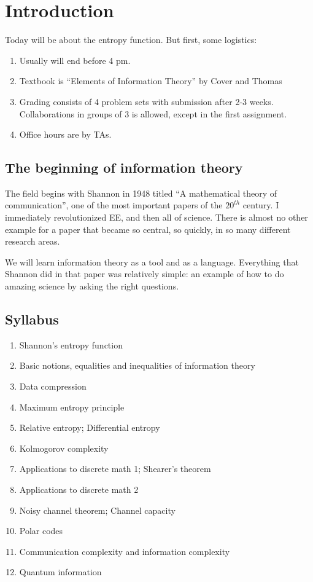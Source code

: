 \documentclass{article}
\begin{document}
\section{Introduction}

Today will be about the entropy function. But first, some logistics:
\begin{enumerate}
    \item Usually will end before 4 pm.
    \item Textbook is ``Elements of Information Theory'' by Cover and Thomas
    \item Grading consists of 4 problem sets with submission after 2-3 weeks. Collaborations in groups of 3 is allowed, except in the first assignment.
    \item Office hours are by TAs. 
\end{enumerate}

\subsection{The beginning of information theory}

The field begins with Shannon in 1948 titled ``A mathematical theory of communication'', one of the most important papers of the $20^{th}$ century. I immediately revolutionized EE, and then all of science. There is almost no other example for a paper that became so central, so quickly, in so many different research areas.

We will learn information theory as a tool and as a language. Everything that Shannon did in that paper was relatively simple: an example of how to do amazing science by asking the right questions.

\subsection{Syllabus}

\begin{enumerate}
    \item Shannon's entropy function
    \item Basic notions, equalities and inequalities of information theory
    \item Data compression 
    \item Maximum entropy principle 
    \item Relative entropy; Differential entropy 
    \item Kolmogorov complexity 
    \item Applications to discrete math 1; Shearer's theorem 
    \item Applications to discrete math 2
    \item Noisy channel theorem; Channel capacity 
    \item Polar codes 
    \item Communication complexity and information complexity 
    \item Quantum information 
\end{enumerate}
\end{document}
